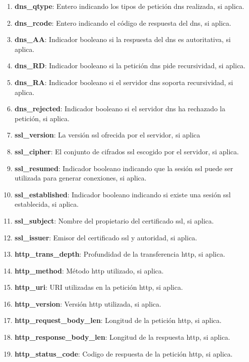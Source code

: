 \begin{enumerate}
  \item \textbf{dns\_qtype}: Entero indicando los tipos de petición \acrshort{dns} realizada, si aplica.
  \item \textbf{dns\_rcode}: Entero indicando el código de respuesta del \acrshort{dns}, si aplica.
  \item \textbf{dns\_AA}: Indicador booleano si la respuesta del \acrshort{dns} es autoritativa, si aplica.
  \item \textbf{dns\_RD}: Indicador booleano si la petición \acrshort{dns} pide recursividad, si aplica.
  \item \textbf{dns\_RA}: Indicador booleano si el servidor \acrshort{dns} soporta recursividad, si aplica.
  \item \textbf{dns\_rejected}: Indicador booleano si el servidor \acrshort{dns} ha rechazado la petición, si aplica.
  \item \textbf{ssl\_version}: La versión \acrshort{ssl} ofrecida por el servidor, si aplica
  \item \textbf{ssl\_cipher}: El conjunto de cifrados \acrshort{ssl} escogido por el servidor, si aplica.
  \item \textbf{ssl\_resumed}: Indicador booleano indicando que la sesión \acrshort{ssl} puede ser utilizada para generar conexiones, si aplica.
  \item \textbf{ssl\_established}: Indicador booleano indicando si existe una sesión \acrshort{ssl} establecida, si aplica.
  \item \textbf{ssl\_subject}: Nombre del propietario del certificado \acrshort{ssl}, si aplica.
  \item \textbf{ssl\_issuer}: Emisor del certificado \acrshort{ssl} y autoridad, si aplica.
  \item \textbf{http\_trans\_depth}: Profundidad de la transferencia \acrshort{http}, si aplica.
  \item \textbf{http\_method}: Método \acrshort{http} utilizado, si aplica.
  \item \textbf{http\_uri}: URI utilizadas en la petición \acrshort{http}, si aplica.
  \item \textbf{http\_version}: Versión \acrshort{http} utilizada, si aplica.
  \item \textbf{http\_request\_body\_len}: Longitud de la petición \acrshort{http}, si aplica.
  \item \textbf{http\_response\_body\_len}: Longitud de la respuesta \acrshort{http}, si aplica.
  \item \textbf{http\_status\_code}: Codigo de respuesta de la petición \acrshort{http}, si aplica.

\end{enumerate}
